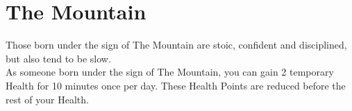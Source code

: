 \section{The Mountain}

Those born under the sign of The Mountain are stoic, confident and disciplined, but also tend to be slow.\\
As someone born under the sign of The Mountain, you can gain 2 temporary Health for 10 minutes once per day. These Health Points are reduced before the rest of your Health.\\